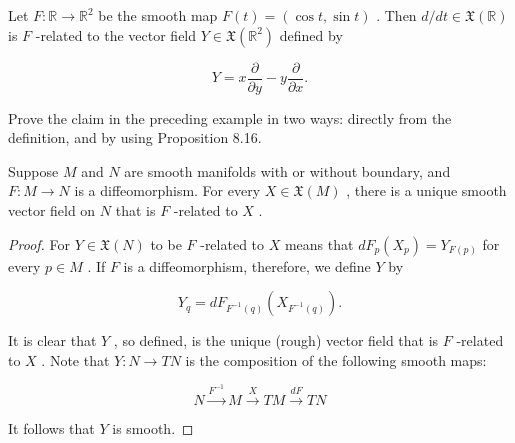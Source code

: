 \begin{example}
\label{ex:8-17}
\leanok
{}
Let $F : \mathbb{R} \rightarrow  {\mathbb{R}}^{2}$ be the smooth map $F\left( t\right)  = \left( {\cos t,\sin t}\right)$ . Then $d/{dt} \in  \mathfrak{X}\left( \mathbb{R}\right)$ is $F$ -related to the vector field $Y \in  \mathfrak{X}\left( {\mathbb{R}}^{2}\right)$ defined by

\[
Y = x\frac{\partial }{\partial y} - y\frac{\partial }{\partial x}.
\]
\end{example}

\begin{exercise}
\label{exer:8-18}
\leanok
{}
Prove the claim in the preceding example in two ways: directly from the definition, and by using Proposition 8.16.
\end{exercise}

\begin{proposition}
\label{prop:8-19}
\leanok
{}
Suppose $M$ and $N$ are smooth manifolds with or without boundary, and $F : M \rightarrow  N$ is a diffeomorphism. For every $X \in  \mathfrak{X}\left( M\right)$ , there is a unique smooth vector field on $N$ that is $F$ -related to $X$ .
\end{proposition}

\begin{proof}
\leanok
For $Y \in  \mathfrak{X}\left( N\right)$ to be $F$ -related to $X$ means that $d{F}_{p}\left( {X}_{p}\right)  = {Y}_{F\left( p\right) }$ for every $p \in  M$ . If $F$ is a diffeomorphism, therefore, we define $Y$ by

\[
{Y}_{q} = d{F}_{{F}^{-1}\left( q\right) }\left( {X}_{{F}^{-1}\left( q\right) }\right) .
\]

It is clear that $Y$ , so defined, is the unique (rough) vector field that is $F$ -related to $X$ . Note that $Y : N \rightarrow  {TN}$ is the composition of the following smooth maps:

\[
N\overset{{F}^{-1}}{ \rightarrow  }M\overset{X}{ \rightarrow  }{TM}\overset{dF}{ \rightarrow  }{TN}
\]

It follows that $Y$ is smooth.
\end{proof}

